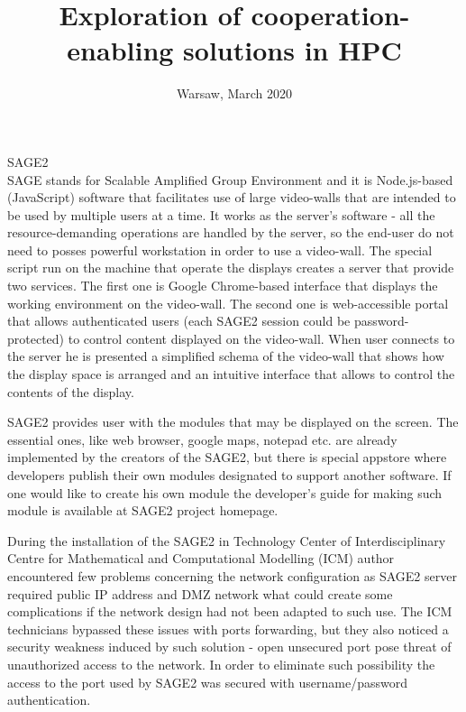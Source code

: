 \documentclass[magisterska,en]{pracamgr}
\title{Exploration of cooperation-enabling solutions in HPC}
\date{Warsaw, March 2020}
\begin{document}
\maketitle
\thispagestyle{empty}

 \noindent SAGE2\\
 SAGE stands for Scalable Amplified Group Environment and it is Node.js-based (JavaScript) software that facilitates use of large video-walls that are intended to be used by multiple users at a time. It works as the server's software - all the resource-demanding operations are handled by the server, so the end-user do not need to posses powerful workstation in order to use a
 video-wall. The special script run on the machine that operate the displays creates a server that provide two services. The first one is Google Chrome-based interface that displays the working environment on the video-wall. The second one is web-accessible portal that allows authenticated users (each SAGE2 session could be password-protected) to control content displayed on the video-wall. When user connects to the server he is presented a simplified schema of the video-wall that shows how the display space is arranged and an intuitive interface that allows to control the contents of the display. \cite{SAGE2_developers}
 
 
 SAGE2 provides user with the modules that may be displayed on the screen. The essential ones, like web browser, google maps, notepad etc. are already implemented by the creators of the SAGE2, but there is special appstore where developers publish their own modules designated to support another software. If one would like to create his own module the developer's guide for making such module is available at SAGE2 project homepage.
 
 During the installation of the SAGE2 in Technology Center of Interdisciplinary Centre for Mathematical and Computational Modelling (ICM) author encountered few problems concerning the network configuration as SAGE2 server required public IP address and DMZ network what could create some complications if the network design had not been adapted to such use. The ICM technicians bypassed these issues with ports forwarding, but they also noticed a security weakness induced by such solution - open unsecured port pose threat of unauthorized access to the network. In order to eliminate such possibility the access to the port used by SAGE2 was secured with username/password authentication. 
 
\end{document}
